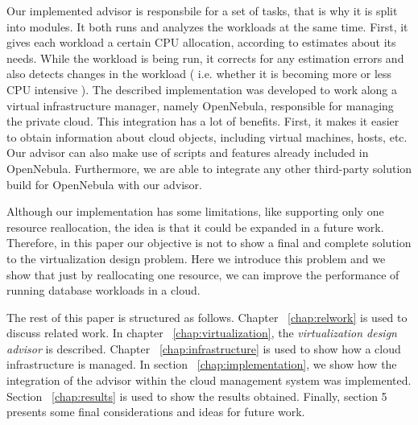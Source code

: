 Our implemented advisor is responsbile for a set of tasks, that is why it is split into modules. It both runs and analyzes the workloads  at the same time. First, it gives each workload a certain CPU allocation, according to estimates about its needs. While the workload is being run, it corrects for any estimation errors and also detects changes in the workload ( i.e. whether it is becoming more or less CPU intensive ). The described implementation was developed to work along a virtual infrastructure manager, namely OpenNebula, responsible for managing the private cloud. This integration has a lot of benefits. First, it makes it easier to obtain information about cloud objects, including virtual machines, hosts, etc. Our advisor can also make use of scripts and features already included in OpenNebula. Furthermore, we are able to integrate any other third-party solution build for OpenNebula with our advisor. 

Although our implementation has some limitations, like supporting only one resource reallocation, the idea is that it could be expanded in a future work. Therefore, in this paper our objective is not to show a final and complete solution to the virtualization design problem. Here we introduce this problem and we show that just by reallocating one resource, we can improve the performance of running database workloads in a cloud. 

The rest of this paper is structured as follows. Chapter ~\ref{chap:relwork} is used to discuss related work. In chapter ~\ref{chap:virtualization}, the \textit{virtualization design advisor} is described. Chapter ~\ref{chap:infrastructure} is used to show how a cloud infrastructure is managed. In section ~\ref{chap:implementation}, we show how the integration of the advisor within the cloud management system was implemented. Section ~\ref{chap:results} is used to show the results obtained. Finally, section 5 presents some final considerations and ideas for future work.

